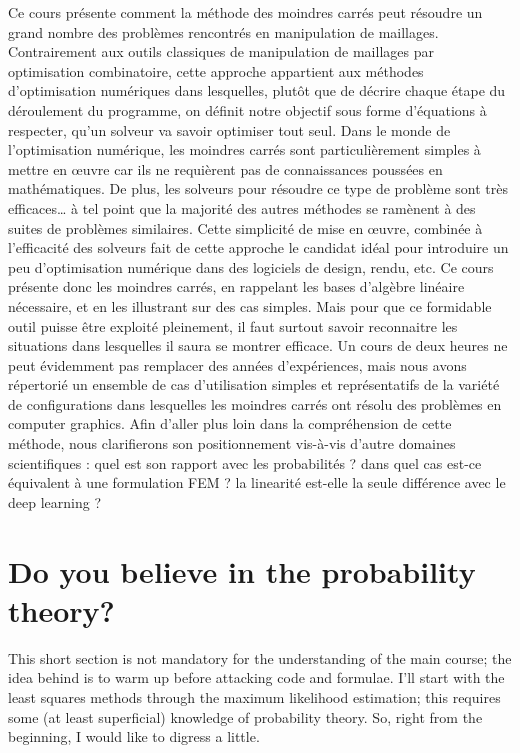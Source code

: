 \documentclass[notitlepage,oneside]{book}
\makeatletter
\newcommand{\authoredby}[1]{\addtocontents{toc}{\protect\@nameuse{authoredby#1}}}%
\makeatother
\begin{document}
Ce cours présente comment la méthode des moindres carrés peut résoudre un grand nombre des problèmes rencontrés en manipulation de maillages.
Contrairement aux outils classiques de manipulation de maillages par optimisation combinatoire, cette approche appartient aux méthodes d'optimisation numériques dans lesquelles, 
plutôt que de décrire chaque étape du déroulement du programme, on définit notre objectif sous forme d'équations à respecter, qu'un solveur va savoir optimiser tout seul.
Dans le monde de l'optimisation numérique, les moindres carrés sont particulièrement simples à mettre en œuvre car ils ne requièrent pas de connaissances poussées en mathématiques. 
De plus, les solveurs pour résoudre ce type de problème sont très efficaces… à tel point que la majorité des autres méthodes se ramènent à des suites de problèmes similaires. 
Cette simplicité de mise en œuvre, combinée à l'efficacité des solveurs fait de cette approche le candidat idéal pour introduire un peu d'optimisation numérique dans des logiciels de design, rendu, etc.
Ce cours présente donc les moindres carrés, en rappelant les bases d'algèbre linéaire nécessaire, et en les illustrant sur des cas simples. 
Mais pour que ce formidable outil puisse être exploité pleinement, il faut surtout savoir reconnaitre les situations dans lesquelles il saura se montrer efficace. 
Un cours de deux heures ne peut évidemment pas remplacer des années d'expériences, mais nous avons répertorié un ensemble de cas d'utilisation simples et représentatifs 
de la variété de configurations dans lesquelles les moindres carrés ont résolu des problèmes en computer graphics.
Afin d'aller plus loin dans la compréhension de cette méthode, nous clarifierons son positionnement vis-à-vis d'autre domaines scientifiques : quel est son rapport avec les probabilités ? 
dans quel cas est-ce équivalent à une formulation FEM ? la linearité est-elle la seule différence avec le deep learning ?

\fi












\authoredby{A}
\chapter{Do you believe in the probability theory?}
\fancyhead[R]{\textcolor{red}{optional for reading}}

This short section is not mandatory for the understanding of the main course; 
the idea behind is to warm up before attacking code and formulae.
I'll start with the least squares methods through the maximum likelihood estimation;
this requires some (at least superficial) knowledge of probability theory. 
So, right from the beginning, I would like to digress a little.
\end{document}
